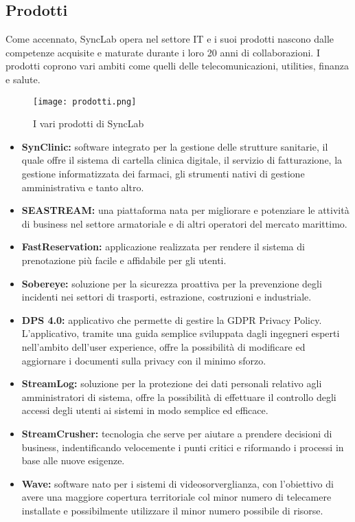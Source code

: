 \subsection{Prodotti}
Come accennato, SyncLab opera nel settore IT e i suoi prodotti nascono dalle competenze acquisite e maturate durante i loro 20 anni di collaborazioni. I prodotti coprono vari ambiti come quelli delle telecomunicazioni, utilities, finanza e salute.
\begin{figure}[H]
    \centering
    \texttt{[image: prodotti.png]}
    \caption{I vari prodotti di SyncLab}
\end{figure}
\begin{itemize}
    \item \textbf{SynClinic:} software integrato per la gestione delle strutture sanitarie, il quale offre il sistema di cartella clinica digitale, il servizio di fatturazione, la gestione informatizzata dei farmaci, gli strumenti nativi di gestione amministrativa e tanto altro.
    \item \textbf{SEASTREAM:} una piattaforma nata per migliorare e potenziare le attività di business nel settore armatoriale e di altri operatori del mercato marittimo.
    \item \textbf{FastReservation:} applicazione realizzata per rendere il sistema di prenotazione più facile e affidabile per gli utenti.
    \item \textbf{Sobereye:} soluzione per la sicurezza proattiva per la prevenzione degli incidenti nei settori di trasporti, estrazione, costruzioni e industriale.
    \item \textbf{DPS 4.0:} applicativo che permette di gestire la GDPR Privacy Policy. L'applicativo, tramite una guida semplice sviluppata dagli ingegneri esperti nell'ambito dell'user experience, offre la possibilità di modificare ed aggiornare i documenti sulla privacy con il minimo sforzo.
    \item \textbf{StreamLog:} soluzione per la protezione dei dati personali relativo agli amministratori di sistema, offre la possibilità di effettuare il controllo degli accessi degli utenti ai sistemi in modo semplice ed efficace.
    \item \textbf{StreamCrusher:} tecnologia che serve per aiutare a prendere decisioni di business, indentificando velocemente i punti critici e riformando i processi in base alle nuove esigenze.
    \item \textbf{Wave:} software nato per i sistemi di videosorverglianza, con l'obiettivo di avere una maggiore copertura territoriale col minor numero di telecamere installate e possibilmente utilizzare il minor numero possibile di risorse.
\end{itemize}

